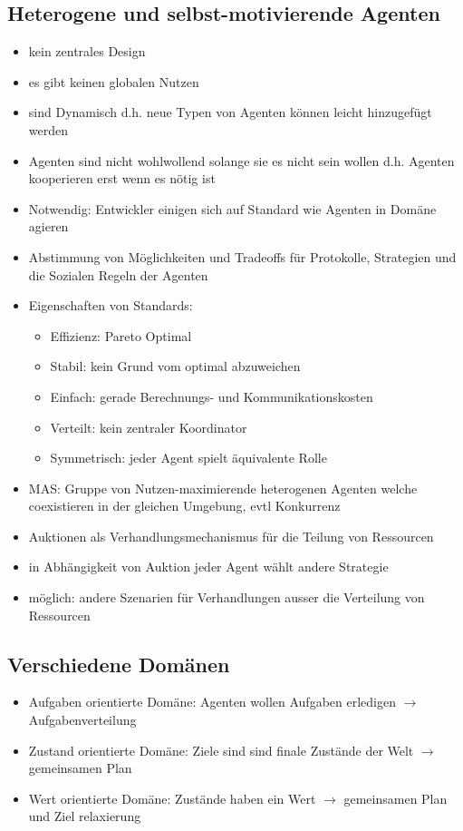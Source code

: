 \documentclass{article} %
\begin{document}
	\subsection{Heterogene und selbst-motivierende Agenten}
	\begin{itemize}
		\item kein zentrales Design
		\item es gibt keinen globalen Nutzen
		\item sind Dynamisch d.h. neue Typen von Agenten können leicht hinzugefügt werden
		\item Agenten sind nicht wohlwollend solange sie es nicht sein wollen d.h. Agenten kooperieren erst wenn es nötig ist
		\item Notwendig: Entwickler einigen sich auf Standard wie Agenten in Domäne agieren
		\item Abstimmung von Möglichkeiten und Tradeoffs für Protokolle, Strategien und die Sozialen Regeln der Agenten
		\item Eigenschaften von Standards:
		\begin{itemize}
			\item Effizienz: Pareto Optimal
			\item Stabil: kein Grund vom optimal abzuweichen
			\item Einfach: gerade Berechnungs- und Kommunikationskosten
			\item Verteilt: kein zentraler Koordinator
			\item Symmetrisch: jeder Agent spielt äquivalente Rolle
		\end{itemize}
		\item MAS: Gruppe von Nutzen-maximierende heterogenen Agenten welche coexistieren in der gleichen Umgebung, evtl Konkurrenz
		\item Auktionen als Verhandlungsmechanismus für die Teilung von Ressourcen
		\item in Abhängigkeit von Auktion jeder Agent wählt andere Strategie
		\item möglich: andere Szenarien für Verhandlungen ausser die Verteilung von Ressourcen
	\end{itemize}
	\subsection{Verschiedene Domänen}
	\begin{itemize}
		\item Aufgaben orientierte Domäne: Agenten wollen Aufgaben erledigen $\rightarrow$ Aufgabenverteilung
		\item Zustand orientierte Domäne: Ziele sind sind finale Zustände der Welt $\rightarrow$ gemeinsamen Plan
		\item Wert orientierte Domäne: Zustände haben ein Wert $\rightarrow$ gemeinsamen Plan und Ziel relaxierung
	\end{itemize}
\end{document}
